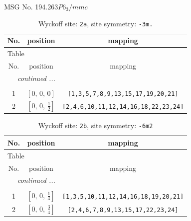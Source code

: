 \documentclass[fleqn,8pt]{jsarticle}
\begin{document}
\setcounter{MaxMatrixCols}{32}

\renewcommand{\tablename}{Table~}
\renewcommand{\figurename}{Figure~}
\begin{center}
\LARGE
MSG No. 194.263\quad$P6_{3}/mmc$
\end{center}
\renewcommand{\arraystretch}{1.2}
\begin{longtable}{ccc}
\caption{Wyckoff site: {\tt 2a}, site symmetry: {\tt -3m.}}
 \\
 \hline \hline
No. & position & mapping \\ \hline \endfirsthead

\multicolumn{2}{l}{\tablename\ \thetable{}} \\
 \hline \hline
No. & position & mapping \\ \hline \endhead

 \hline \hline
\multicolumn{2}{r}{\footnotesize\it continued ...} \\ \endfoot

 \hline \hline
\multicolumn{2}{r}{} \\ \endlastfoot

1 & $\left[ 0,\, 0,\, 0 \right]$ & {\tt [1,3,5,7,8,9,13,15,17,19,20,21]} \\ \hline
2 & $\left[ 0,\, 0,\, \frac{1}{2} \right]$ & {\tt [2,4,6,10,11,12,14,16,18,22,23,24]} \\
\end{longtable}
\renewcommand{\arraystretch}{1.2}
\begin{longtable}{ccc}
\caption{Wyckoff site: {\tt 2b}, site symmetry: {\tt -6m2}}
 \\
 \hline \hline
No. & position & mapping \\ \hline \endfirsthead

\multicolumn{2}{l}{\tablename\ \thetable{}} \\
 \hline \hline
No. & position & mapping \\ \hline \endhead

 \hline \hline
\multicolumn{2}{r}{\footnotesize\it continued ...} \\ \endfoot

 \hline \hline
\multicolumn{2}{r}{} \\ \endlastfoot

1 & $\left[ 0,\, 0,\, \frac{1}{4} \right]$ & {\tt [1,3,5,10,11,12,14,16,18,19,20,21]} \\ \hline
2 & $\left[ 0,\, 0,\, \frac{3}{4} \right]$ & {\tt [2,4,6,7,8,9,13,15,17,22,23,24]} \\
\end{longtable}
\end{document}
